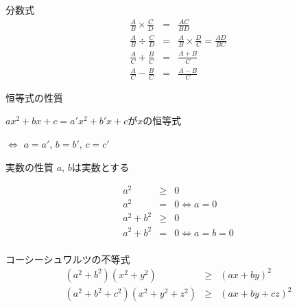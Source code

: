 \documentclass[aspectratio=169, 12pt]{beamer} %
\begin{document}
\begin{frame}{分数式}
    \begin{eqnarray*}
        \frac{A}{B}\times\frac{C}{D} &=& \frac{AC}{BD} \\
        \frac{A}{B}\div \frac{C}{D}&=&\frac{A}{B}\times \frac{D}{C}=\frac{AD}{BC} \\
        \frac{A}{C}+ \frac{B}{C}&=&\frac{A+B}{C} \\
        \frac{A}{C}-\frac{B}{C}&=&\frac{A-B}{C}
    \end{eqnarray*}
\end{frame}
\begin{frame}{恒等式の性質}
    \begin{center}
        $ax^2+bx+c=a'x^2+b'x+c$が$x$の恒等式\par
        $\Leftrightarrow$ \space $a=a'$, $b=b'$, $c=c'$
    \end{center}
\end{frame}
\begin{frame}{実数の性質}
    $a$, $b$は実数とする \par
    \begin{eqnarray*}
        a^2 &\geq& 0 \\
        a^2 &=&0 \Leftrightarrow a=0 \\
        a^2+b^2&\geq& 0 \\
        a^2+b^2&=&0 \Leftrightarrow a=b=0 \\
    \end{eqnarray*}
\end{frame}
\begin{frame}{コーシーシュワルツの不等式}
    \begin{eqnarray*}
        (a^2+b^2)(x^2+y^2)&\geq& (ax+by)^2 \\
        (a^2+b^2+c^2)(x^2+y^2+z^2)&\geq& (ax+by+cz)^2 \\
    \end{eqnarray*}
\end{frame}
\end{document}
